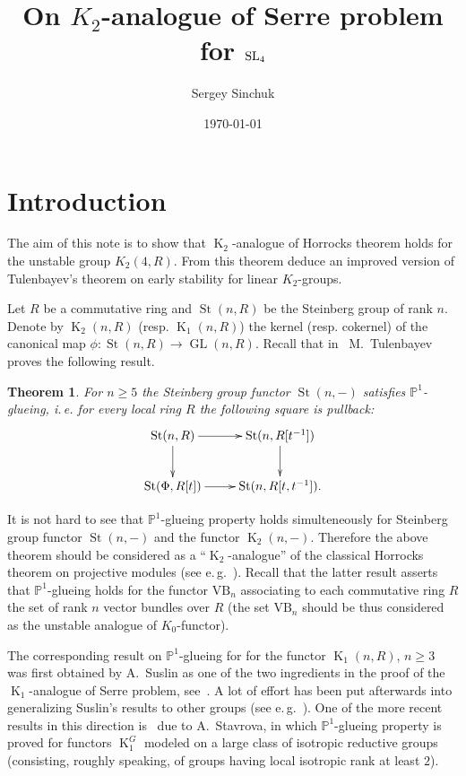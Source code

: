 \documentclass[oneside, 10pt]{amsart}
\title{On $K_2$-analogue of Serre problem for $\operatorname{SL}_4$}
\author {Sergey Sinchuk}
\date {\today}
\DeclareMathOperator{\St}{St}
\DeclareMathOperator{\GL}{GL}
\DeclareMathOperator{\K}{K}
\numberwithin{equation}{section}
\numberwithin{lemma}{section}
\newtheorem*{thm*}{Theorem}
\theoremstyle{definition}
\theoremstyle{remark}
\begin{document}
   
\maketitle

\section{Introduction}

The aim of this note is to show that $\K_2$-analogue of Horrocks theorem holds for the unstable group $K_{2}(4, R)$.
From this theorem deduce an improved version of Tulenbayev's theorem on early stability for linear $K_2$-groups.

Let $R$ be a commutative ring and $\St(n, R)$ be the Steinberg group of rank $n$.
Denote by $\K_2(n, R)$ (resp. $\K_1(n, R)$) the kernel (resp. cokernel) of the canonical map $\phi\colon \St(n, R) \to \GL(n, R)$.
Recall that in~\cite[Theorem~5.1]{Tu83} M.~Tulenbayev proves the following result.
\begin{thm*} For $n \geq 5$ the Steinberg group functor $\St(n, -)$ satisfies $\mathbb{P}^1$-glueing, i.\,e. for every
 local ring $R$ the following square is pullback:
 \[\xymatrix{ \St(n, R)    \ar[r]\ar[d] & \ar[d] \St(n, R[t^{-1}]) \\ 
              \St(\Phi, R[t]) \ar[r]       &        \St(n, R[t, t^{-1}]).}\]
\end{thm*}
It is not hard to see that $\mathbb{P}^1$-glueing property holds simulteneously for Steinberg group functor $\St(n, -)$ and the functor $\K_2(n, -)$. Therefore the above theorem should be considered as a ``$\K_2$-analogue'' of the classical Horrocks theorem on projective modules (see e.\,g.~\cite[Ch.~IV]{Lam10}).
Recall that the latter result asserts that $\mathbb{P}^1$-glueing holds for the functor $\mathrm{VB}_n$ associating to each commutative ring $R$ the set of rank $n$ vector bundles over $R$ (the set $\mathrm{VB}_n$ should be thus considered as the unstable analogue of $K_0$-functor).

The corresponding result on $\mathbb{P}^1$-glueing for for the functor $\K_1(n, R)$,  $n\geq 3$ was first obtained by A.~Suslin as one of the two ingredients in the proof of the $\K_1$-analogue of Serre problem, see~\cite{Su77}. A lot of effort has been put afterwards into generalizing Suslin's results to other groups (see e.\,g.~\cite{Abe83}).  One of the more recent results in this direction is~\cite[Theorem~1.1]{St-poly} due to A.~Stavrova, in which $\mathbb{P}^1$-glueing property is proved for functors $\K_1^G$ modeled on a large class of isotropic reductive groups (consisting, roughly speaking, of groups having local isotropic rank at least $2$). %
\end{document}
